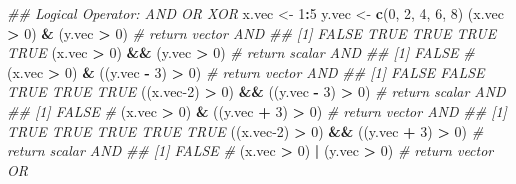 \documentclass[
]{book}
\newenvironment{Shaded}{\begin{snugshade}}{\end{snugshade}}
\newcommand{\CommentTok}[1]{\textcolor[rgb]{0.56,0.35,0.01}{\textit{#1}}}
\newcommand{\DecValTok}[1]{\textcolor[rgb]{0.00,0.00,0.81}{#1}}
\newcommand{\KeywordTok}[1]{\textcolor[rgb]{0.13,0.29,0.53}{\textbf{#1}}}
\newcommand{\NormalTok}[1]{#1}
\newcommand{\OperatorTok}[1]{\textcolor[rgb]{0.81,0.36,0.00}{\textbf{#1}}}
\newcommand{\StringTok}[1]{\textcolor[rgb]{0.31,0.60,0.02}{#1}}
\begin{document}
\begin{Shaded}
\begin{Highlighting}[]
\CommentTok{\#\# Logical Operator: AND OR XOR}
\NormalTok{x.vec \textless{}{-}}\StringTok{ }\DecValTok{1}\OperatorTok{:}\DecValTok{5}
\NormalTok{y.vec \textless{}{-}}\StringTok{ }\KeywordTok{c}\NormalTok{(}\DecValTok{0}\NormalTok{, }\DecValTok{2}\NormalTok{, }\DecValTok{4}\NormalTok{, }\DecValTok{6}\NormalTok{, }\DecValTok{8}\NormalTok{)}
\NormalTok{(x.vec }\OperatorTok{\textgreater{}}\StringTok{ }\DecValTok{0}\NormalTok{) }\OperatorTok{\&}\StringTok{  }\NormalTok{(y.vec }\OperatorTok{\textgreater{}}\StringTok{ }\DecValTok{0}\NormalTok{)  }\CommentTok{\# return vector AND}
\CommentTok{\#\# [1] FALSE  TRUE  TRUE  TRUE  TRUE}
\NormalTok{(x.vec }\OperatorTok{\textgreater{}}\StringTok{ }\DecValTok{0}\NormalTok{) }\OperatorTok{\&\&}\StringTok{ }\NormalTok{(y.vec }\OperatorTok{\textgreater{}}\StringTok{ }\DecValTok{0}\NormalTok{)  }\CommentTok{\# return scalar AND}
\CommentTok{\#\# [1] FALSE}
\CommentTok{\#}
\NormalTok{(x.vec }\OperatorTok{\textgreater{}}\StringTok{ }\DecValTok{0}\NormalTok{) }\OperatorTok{\&}\StringTok{  }\NormalTok{((y.vec }\OperatorTok{{-}}\StringTok{ }\DecValTok{3}\NormalTok{) }\OperatorTok{\textgreater{}}\StringTok{ }\DecValTok{0}\NormalTok{)     }\CommentTok{\# return vector AND}
\CommentTok{\#\# [1] FALSE FALSE  TRUE  TRUE  TRUE}
\NormalTok{((x.vec}\DecValTok{{-}2}\NormalTok{) }\OperatorTok{\textgreater{}}\StringTok{ }\DecValTok{0}\NormalTok{) }\OperatorTok{\&\&}\StringTok{ }\NormalTok{((y.vec }\OperatorTok{{-}}\StringTok{ }\DecValTok{3}\NormalTok{) }\OperatorTok{\textgreater{}}\StringTok{ }\DecValTok{0}\NormalTok{) }\CommentTok{\# return scalar AND}
\CommentTok{\#\# [1] FALSE}
\CommentTok{\#}
\NormalTok{(x.vec }\OperatorTok{\textgreater{}}\StringTok{ }\DecValTok{0}\NormalTok{) }\OperatorTok{\&}\StringTok{  }\NormalTok{((y.vec }\OperatorTok{+}\StringTok{ }\DecValTok{3}\NormalTok{) }\OperatorTok{\textgreater{}}\StringTok{ }\DecValTok{0}\NormalTok{)     }\CommentTok{\# return vector AND}
\CommentTok{\#\# [1] TRUE TRUE TRUE TRUE TRUE}
\NormalTok{((x.vec}\DecValTok{{-}2}\NormalTok{) }\OperatorTok{\textgreater{}}\StringTok{ }\DecValTok{0}\NormalTok{) }\OperatorTok{\&\&}\StringTok{ }\NormalTok{((y.vec }\OperatorTok{+}\StringTok{ }\DecValTok{3}\NormalTok{) }\OperatorTok{\textgreater{}}\StringTok{ }\DecValTok{0}\NormalTok{) }\CommentTok{\# return scalar AND}
\CommentTok{\#\# [1] FALSE}
\CommentTok{\#}
\NormalTok{(x.vec }\OperatorTok{\textgreater{}}\StringTok{ }\DecValTok{0}\NormalTok{) }\OperatorTok{|}\StringTok{ }\NormalTok{(y.vec }\OperatorTok{\textgreater{}}\StringTok{ }\DecValTok{0}\NormalTok{) }\CommentTok{\# return vector OR}

\end{Highlighting}
\end{Shaded}
\end{document}
